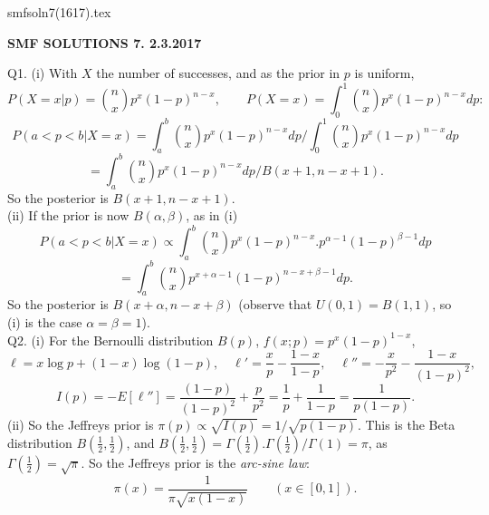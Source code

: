 \documentclass[12pt]{article}
\begin{document}
\def\ni{\noindent}
\def\i{\indent}
\def\a{\alpha}
\def\b{\beta}
\def\e{\epsilon}
\def\d{\delta}
\def\g{\gamma}
\def\qq{\qquad}
\def\q{\quad}
\def\L{\Lambda}
\def\C{\cal C}
\def\E{\cal E}
\def\G{\Gamma}
\def\F{\cal F}
\def\K{\cal K}
\def\O{\cal O}
\def\A{\cal A}
\def\B{\cal B}
\def\S{\cal S}
\def\N{\cal N}
\def\M{\cal M}
\def\P{\cal P}
\def\Om{\Omega}
\def\om{\omega}
\def\s{\sigma}
\def\t{\theta}
\def\z{\zeta}
\def\p{\phi}
\def\m{\mu}
\def\n{\nu}
\def\b{\beta}
\def\e{\epsilon}
\def\l{\lambda}
\def\Si{\Sigma}
\def\half{\frac{1}{2}}
\def\hb{\hfil \break}
\ni smfsoln7(1617).tex \\
\begin{center}
{\bf SMF SOLUTIONS 7.  2.3.2017} \\
\end{center}

\ni Q1. (i) With $X$ the number of successes, and as the prior in $p$ is uniform,
$$
P(X = x|p) = {n \choose x} p^x (1-p)^{n-x}, \qquad
P(X = x) = \int_0^1 {n \choose x} p^x (1-p)^{n-x} dp:
$$
$$
P(a < p < b|X = x) = \int_a^b {n \choose x} p^x (1-p)^{n-x} dp/\int_0^1 {n \choose x} p^x (1-p)^{n-x} dp
$$
$$
= \int_a^b {n \choose x} p^x (1-p)^{n-x} dp/B(x+1, n-x+1).
$$
So the posterior is $B(x+1, n-x+1)$. \\
(ii) If the prior is now $B(\a, \b)$, as in (i)
$$
P(a < p < b|X = x) \propto \int_a^b {n \choose x} p^x (1-p)^{n-x}. p^{\a - 1} (1-p)^{\b - 1} dp
$$
$$
= \int_a^b {n \choose x} p^{x + \a - 1} (1-p)^{n-x + \b -1} dp.
$$
So the posterior is $B(x+\a, n-x+\b)$ (observe that $U(0,1) = B(1,1)$, so (i) is the case $\a = \b = 1$). \\

\ni Q2. (i) For the Bernoulli distribution $B(p)$, $f(x;p) = p^x (1-p)^{1-x}$,
$$
\ell = x \log p + (1-x) \log (1-p), \q
{\ell}' = \frac{x}{p} - \frac{1-x}{1-p},
\q
{\ell}'' = - \frac{x}{p^2} - \frac{1-x}{(1-p)^2},
$$
$$
I(p) = - E[{\ell}''] = \frac{(1-p)}{(1-p)^2} + \frac{p}{p^2} = \frac{1}{p} + \frac{1}{1-p} = \frac{1}{p(1-p)}.
$$
(ii) So the Jeffreys prior is $\pi(p) \propto \sqrt{I(p)} = 1/\sqrt{p(1-p)}$.
This is the Beta distribution $B(\half, \half)$, and $B(\half, \half) = \G(\half).\G(\half)/\G(1) = \pi$, as $\G(\half) = \sqrt{\pi}$.  So the Jeffreys prior is the {\it arc-sine law}:
$$
\pi(x) = \frac{1}{\pi \sqrt{x(1-x)}} \qquad (x \in [0,1]).
$$
\end{document}
